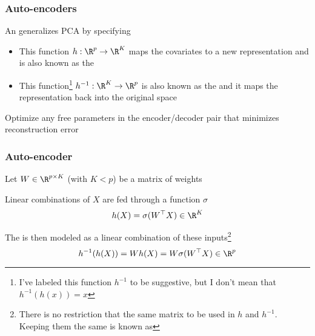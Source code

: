 \documentclass[12pt]{beamer}
\begin{document}
\begin{frame}[fragile]
\frametitle{Auto-encoders}
An  generalizes PCA by specifying

\vsp

\begin{itemize}
\item {} This function $h: \R^p \rightarrow \R^K$ 
maps the covariates to a new representation
and is also known as the  
\item {} This 
function\footnote{I've labeled this function
$h^{-1}$ to be suggestive, but I don't mean that $h^{-1}(h(x)) = x$} 
$h^{-1}: \R^K \rightarrow \R^p$ 
is also known as the  and it maps the
representation back into the original space
\end{itemize}
\vsp

 Optimize any free parameters in the encoder/decoder pair that minimizes reconstruction
error

\end{frame}
%
%
%
%



\begin{frame}[fragile]
\frametitle{Auto-encoder}
Let $W \in \R^{p \times K}$ (with $K < p$) be a matrix of weights

\vsp
Linear combinations of  $X$ are fed through a function $\sigma$
\[
h(X) = \sigma(W^{\top}X)\in \R^K
\]

\vsp
The  is then modeled as a linear combination of these inputs\footnote{There is no restriction that
the same matrix to be used in $h$ and $h^{-1}$.  Keeping them the same is known as }
\[
h^{-1}(h(X)) = Wh(X) = W\sigma(W^{\top}X) \in \R^p
\]
\end{frame}
\end{document}
